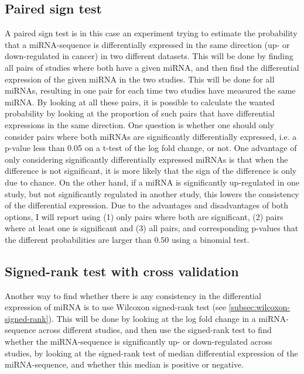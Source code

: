 \subsection{Paired sign test}
\label{subsec:paired_sign_test_met}
A paired sign test is in this case an experiment trying to estimate the probability that a miRNA-sequence is differentially expressed in the same direction (up- or down-regulated in cancer) in two different datasets. This will be done by finding all pairs of studies where both have a given miRNA, and then find the differential expression of the given miRNA in the two studies. This will be done for all miRNAs, resulting in one pair for each time two studies have measured the same miRNA. By looking at all these pairs, it is possible to calculate the wanted probability by looking at the proportion of such pairs that have differential expressions in the same direction. One question is whether one should only consider pairs where both miRNAs are significantly differentially expressed, i.e. a p-value less than 0.05 on a t-test of the log fold change, or not. One advantage of only considering significantly differentially expressed miRNAs is that when the difference is not significant, it is more likely that the sign of the difference is only due to chance. On the other hand, if a miRNA is significantly up-regulated in one study, but not significantly regulated in another study, this lowers the consistency of the differential expression. Due to the advantages and disadvantages of both options, I will report using (1) only pairs where both are significant, (2) pairs where at least one is significant and (3) all pairs, and corresponding p-values that the different probabilities are larger than $0.50$ using a binomial test.

\subsection{Signed-rank test with cross validation}
Another way to find whether there is any consistency in the differential expression of miRNA is to use Wilcoxon signed-rank test (see \autoref{subsec:wilcoxon-signed-rank}). This will be done by looking at the log fold change in a miRNA-sequence across different studies, and then use the signed-rank test to find whether the miRNA-sequence is significantly up- or down-regulated across studies, by looking at the signed-rank test of median differential expression of the miRNA-sequence, and whether this median is positive or negative.

